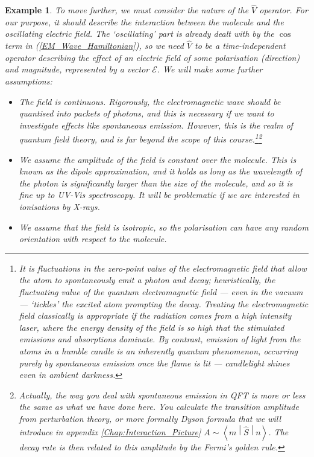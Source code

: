 \documentclass{article}
\theoremstyle{plain}\theoremheaderfont{\normalfont\itshape}\theorembodyfont{\rmfamily}\theoremseparator{.}\newtheorem*{rem}{Remark}\newtheorem*{ex}{Example}\newtheorem*{proof}{Proof}\newtheorem*{altp}{Alternative proof}
\theoremstyle{plain}\theoremheaderfont{\normalfont\bfseries}\theorembodyfont{\rmfamily}\theoremseparator{.}\newtheorem{thm}{Theorem}[section]\newtheorem{lem}[thm]{Lemma}\newtheorem{prop}[thm]{Proposition}\newtheorem*{cor}{Corollary}\newtheorem{defn}[thm]{Definition}\newtheorem{clm}[thm]{Claim}\newtheorem{clminproof}{Claim}
\theoremstyle{break}\theoremheaderfont{\normalfont\itshape}\theorembodyfont{\rmfamily}\theoremseparator{.\medskip}\newtheorem*{proofskip}{Proof}\newtheorem*{exs}{Examples}\newtheorem*{rems}{Remarks}
\theoremstyle{break}\theoremheaderfont{\normalfont\bfseries}\theorembodyfont{\rmfamily}\theoremseparator{.\medskip}\newtheorem{lemskip}[thm]{Lemma}\newtheorem{defnskip}[thm]{Definition}\newtheorem{propskip}[thm]{Proposition}\newtheorem{thmskip}[thm]{Theorem}
\numberwithin{equation}{section}
\newcommand{\mel}[3]{\left\langle #1 \middle| #2 \middle| #3 \right\rangle}
\newcommand{\vb}[1]{\bm{\mathrm{#1}}}
\begin{document}
\begin{ex}
        To move further, we must consider the nature of the \(\hat{V}\) operator. For our purpose, it should describe the interaction between the molecule and the oscillating electric field. The `oscillating' part is already dealt with by the \(\cos\) term in (\ref{EM_Wave_Hamiltonian}), so we need \(\hat{V}\) to be a time-independent operator describing the effect of an electric field of some polarisation (direction) and magnitude, represented by a vector \(\vb{\mathcal{E}}\). We will make some further assumptions:
        \begin{itemize}[topsep=0pt]
            \item The field is continuous. Rigorously, the electromagnetic wave should be quantised into packets of photons, and this is necessary if we want to investigate effects like spontaneous emission. However, this is the realm of quantum field theory, and is far beyond the scope of this course.\footnote{It is fluctuations in the zero-point value of the electromagnetic field that allow the atom to spontaneously emit a photon and decay; heuristically, the fluctuating value of the quantum electromagnetic field --- even in the vacuum --- `tickles' the excited atom prompting the decay. Treating the electromagnetic field classically is appropriate if the radiation comes from a high intensity laser, where the energy density of the field is so high that the stimulated emissions and absorptions dominate. By contrast, emission of light from the atoms in a humble candle is an inherently quantum phenomenon, occurring purely by spontaneous emission once the flame is lit --- candlelight shines even in ambient darkness.}\footnote{Actually, the way you deal with spontaneous emission in QFT is more or less the same as what we have done here. You calculate the transition amplitude from perturbation theory, or more formally Dyson formula that we will introduce in appendix \cref{Chap:Interaction_Picture} \(A\sim\mel{m}{\hat{S}}{n}\). The decay rate is then related to this amplitude by the Fermi's golden rule.}
            \item We assume the amplitude of the field is constant over the molecule. This is known as the \textit{dipole approximation}, and it holds as long as the wavelength of the photon is significantly larger than the size of the molecule, and so it is fine up to UV-Vis spectroscopy. It will be problematic if we are interested in ionisations by X-rays.
            \item We assume that the field is isotropic, so the polarisation can have any random orientation with respect to the molecule.
        \end{itemize}


\end{ex}
\end{document}

